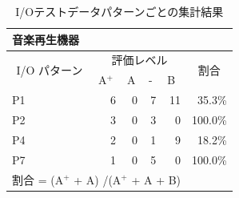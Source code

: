 \begin{table}[htbp]
  \centering
  \caption{I/Oテストデータパターンごとの集計結果}
    \begin{tabular}{lllllr}
    音楽再生機器 &       &       &       &       &  \bigstrut[b]\\
    \hline
    \multicolumn{1}{|c|}{\multirow{2}[4]{*}{I/O パターン}} & \multicolumn{4}{c|}{評価レベル}    & \multicolumn{1}{c|}{\multirow{2}[4]{*}{割合}} \bigstrut\\
\cline{2-5}    \multicolumn{1}{|c|}{} & \multicolumn{1}{l|}{A${}^\text{+}$} & \multicolumn{1}{l|}{A} & \multicolumn{1}{l|}{-} & \multicolumn{1}{l|}{B} & \multicolumn{1}{c|}{} \bigstrut\\
    \hline
    \multicolumn{1}{|l|}{P1} & \multicolumn{1}{r|}{6} & \multicolumn{1}{r|}{0} & \multicolumn{1}{r|}{7} & \multicolumn{1}{r|}{11} & \multicolumn{1}{r|}{35.3\%} \bigstrut\\
    \hline
    \multicolumn{1}{|l|}{P2} & \multicolumn{1}{r|}{3} & \multicolumn{1}{r|}{0} & \multicolumn{1}{r|}{3} & \multicolumn{1}{r|}{0} & \multicolumn{1}{r|}{100.0\%} \bigstrut\\
    \hline
    \multicolumn{1}{|l|}{P4} & \multicolumn{1}{r|}{2} & \multicolumn{1}{r|}{0} & \multicolumn{1}{r|}{1} & \multicolumn{1}{r|}{9} & \multicolumn{1}{r|}{18.2\%} \bigstrut\\
    \hline
    \multicolumn{1}{|l|}{P7} & \multicolumn{1}{r|}{1} & \multicolumn{1}{r|}{0} & \multicolumn{1}{r|}{5} & \multicolumn{1}{r|}{0} & \multicolumn{1}{r|}{100.0\%} \bigstrut\\
    \hline
    \multicolumn{5}{l}{割合 = (A${}^\text{+}$  +  A) /(A${}^\text{+}$  +  A + B) } &  \bigstrut[t]\\
    \end{tabular}%
\label{tab:D-4-tab9}%
\end{table}%

